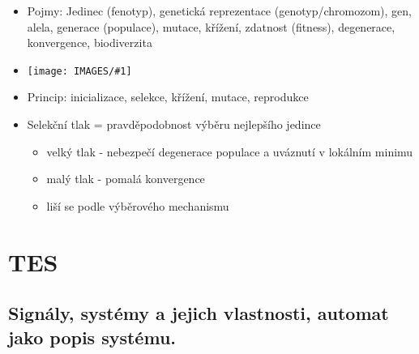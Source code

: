 \documentclass[a4paper,hidelinks]{article}
\newcommand{\myimage}[1] {\texttt{[image: IMAGES/\#1]}}
\begin{document}
\begin{itemize}
    \item Pojmy: Jedinec (fenotyp), genetická reprezentace (genotyp/chromozom), gen, alela, generace (populace), mutace, křížení, zdatnost (fitness), degenerace, konvergence, biodiverzita
    \item \myimage{struktura_ga}
    \item Princip: inicializace, selekce, křížení, mutace, reprodukce
    \item Selekční tlak = pravděpodobnost výběru nejlepšího jedince
    \begin{itemize}
        \item velký tlak - nebezpečí degenerace populace a uváznutí v lokálním minimu
        \item malý tlak - pomalá konvergence
        \item liší se podle výběrového mechanismu
    \end{itemize}
\end{itemize}

\section{TES}

\subsection{Signály, systémy a jejich vlastnosti, automat jako popis systému.}
\end{document}
